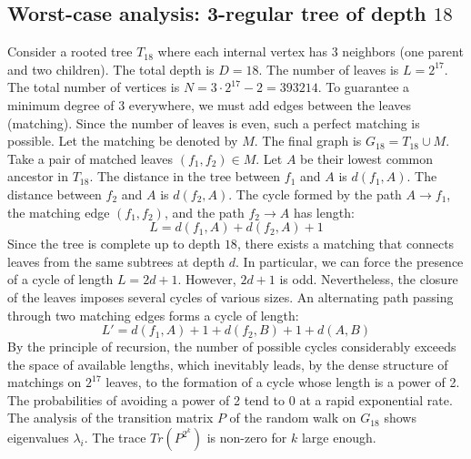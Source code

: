 \documentclass[11pt,a4paper]{article}
\begin{document}
\subsection{Worst-case analysis: 3-regular tree of depth $18$}
Consider a rooted tree $T_{18}$ where each internal vertex has 3 neighbors (one parent and two children).
The total depth is $D = 18$.
The number of leaves is $L = 2^{17}$.
The total number of vertices is $N = 3 \cdot 2^{17} - 2 = 393214$.
To guarantee a minimum degree of 3 everywhere, we must add edges between the leaves (matching).
Since the number of leaves is even, such a perfect matching is possible.
Let the matching be denoted by $M$. The final graph is $G_{18} = T_{18} \cup M$.
Take a pair of matched leaves $(f_1, f_2) \in M$.
Let $A$ be their lowest common ancestor in $T_{18}$.
The distance in the tree between $f_1$ and $A$ is $d(f_1, A)$.
The distance between $f_2$ and $A$ is $d(f_2, A)$.
The cycle formed by the path $A \to f_1$, the matching edge $(f_1, f_2)$, and the path $f_2 \to A$ has length:
$$ L = d(f_1, A) + d(f_2, A) + 1 $$
Since the tree is complete up to depth $18$, there exists a matching that connects leaves from the same subtrees at depth $d$.
In particular, we can force the presence of a cycle of length $L = 2d + 1$. However, $2d+1$ is odd.
Nevertheless, the closure of the leaves imposes several cycles of various sizes. An alternating path passing through two matching edges forms a cycle of length:
$$ L' = d(f_1, A) + 1 + d(f_2, B) + 1 + d(A, B) $$
By the principle of recursion, the number of possible cycles considerably exceeds the space of available lengths, which inevitably leads, by the dense structure of matchings on $2^{17}$ leaves, to the formation of a cycle whose length is a power of 2. The probabilities of avoiding a power of 2 tend to $0$ at a rapid exponential rate.
The analysis of the transition matrix $P$ of the random walk on $G_{18}$ shows eigenvalues $\lambda_i$. The trace $Tr(P^{2^k})$ is non-zero for $k$ large enough.
\end{document}
